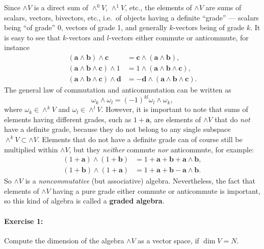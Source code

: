 Since $\wedge V$ is a direct sum of $\wedge^{0}V$, $\wedge^{1}V$,
etc., the elements of $\wedge V$ are sums of scalars, vectors, bivectors,
etc., i.e.~of objects having a definite {}``grade'' --- scalars
being {}``of grade'' 0, vectors of grade 1, and generally $k$-vectors
being of grade $k$. It is easy to see that $k$-vectors and $l$-vectors
either commute or anticommute, for instance\begin{align*}
\left(\mathbf{a}\wedge\mathbf{b}\right)\wedge\mathbf{c} & =\mathbf{c}\wedge\left(\mathbf{a}\wedge\mathbf{b}\right),\\
\left(\mathbf{a}\wedge\mathbf{b}\wedge\mathbf{c}\right)\wedge1 & =1\wedge\left(\mathbf{a}\wedge\mathbf{b}\wedge\mathbf{c}\right),\\
\left(\mathbf{a}\wedge\mathbf{b}\wedge\mathbf{c}\right)\wedge\mathbf{d} & =-\mathbf{d}\wedge\left(\mathbf{a}\wedge\mathbf{b}\wedge\mathbf{c}\right).\end{align*}
The general law of commutation and anticommutation can be written
as \[
\omega_{k}\wedge\omega_{l}=\left(-1\right)^{kl}\omega_{l}\wedge\omega_{k},\]
where $\omega_{k}\in\wedge^{k}V$ and $\omega_{l}\in\wedge^{l}V$.
However, it is important to note that sums of elements having different
grades, such as $1+\mathbf{a}$, are elements of $\wedge V$ that
do \emph{not} have a definite grade, because they do not belong to
any single subspace $\wedge^{k}V\subset\wedge V$. Elements that do
not have a definite grade can of course still be multiplied within
$\wedge V$, but they \emph{neither} commute \emph{nor} anticommute,
for example:\begin{align*}
\left(1+\mathbf{a}\right)\wedge\left(1+\mathbf{b}\right) & =1+\mathbf{a}+\mathbf{b}+\mathbf{a}\wedge\mathbf{b},\\
\left(1+\mathbf{b}\right)\wedge\left(1+\mathbf{a}\right) & =1+\mathbf{a}+\mathbf{b}-\mathbf{a}\wedge\mathbf{b}.\end{align*}
So $\wedge V$ is a \emph{noncommutative} (but associative) algebra.
Nevertheless, the fact that elements of $\wedge V$ having a pure
grade either commute or anticommute is important, so this kind of
algebra is called a \textbf{graded algebra}.


\paragraph{Exercise 1:}

Compute the dimension of the algebra $\wedge V$ as a vector space,
if $\dim V=N$.



